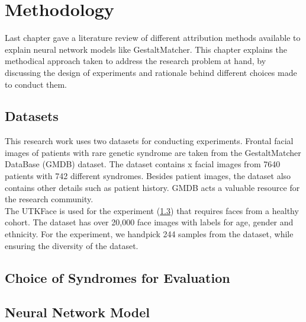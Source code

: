 \documentclass[../report.tex]{subfiles}
\begin{document}
    \chapter{Methodology}
	Last chapter gave a literature review of different attribution methods available to explain neural network models like GestaltMatcher. This chapter explains the methodical approach taken to address the research problem at hand, by discussing the design of experiments and rationale behind different choices made to conduct them. 
	\section{Datasets}
	This research work uses two datasets for conducting experiments. Frontal facial images of patients with rare genetic syndrome are taken from the GestaltMatcher DataBase (GMDB) dataset. The dataset contains \cite{}x facial images from 7640 patients with 742 different syndromes. Besides patient images, the dataset also contains other details such as patient history. GMDB acts a valuable resource for the research community.\\
	The UTKFace \cite{zhifei2017cvpr} is used for the experiment (\ref{}) that requires faces from a healthy cohort. The dataset has over 20,000 face images with labels for age, gender and ethnicity. For the experiment, we handpick 244 samples from the dataset, while ensuring the diversity of the dataset.
	   
	\section{Choice of Syndromes for Evaluation}
	
	\section{Neural Network Model}
    
\end{document}
